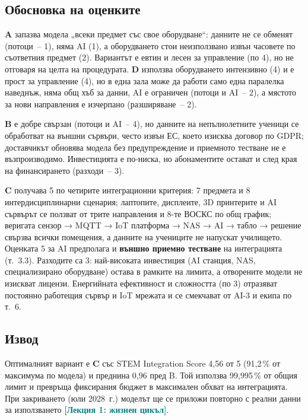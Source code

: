 \documentclass[11pt,a4paper]{article}
\newcommand{\lecturetag}[1]{\textcolor{teal}{\small\bfseries[#1]}}
\newcommand{\PctUse}{99,995\,\%}
\begin{document}
\subsection{Обосновка на оценките}

\textbf{A} запазва модела „всеки предмет със свое оборудване“: данните не се обменят (потоци~– 1), няма AI (1), а оборудването стои неизползвано извън часовете по съответния предмет (2). Вариантът е евтин и лесен за управление (по 4), но не отговаря на целта на процедурата. \textbf{D} използва оборудването интензивно (4) и е прост за управление (4), но в една зала може да работи само една паралелка наведнъж, няма общ хъб за данни, AI е ограничен (потоци и AI~– 2), а мястото за нови направления е изчерпано (разширяване~– 2).

\textbf{B} е добре свързан (потоци и AI~– 4), но данните на непълнолетните ученици се обработват на външни сървъри, често извън ЕС, което изисква договор по GDPR; доставчикът обновява модела без предупреждение и приемното тестване не е възпроизводимо. Инвестицията е по-ниска, но абонаментите остават и след края на финансирането (разходи~– 3).

\textbf{C} получава 5 по четирите интеграционни критерия: 7 предмета и 8 интердисциплинарни сценария; лаптопите, дисплеите, 3D принтерите и AI сървърът се ползват от трите направления и 8-те ВОСКС по общ график; веригата сензор → MQTT → IoT платформа → NAS → AI → табло → решение свързва всички помещения, а данните на учениците не напускат училището. Оценката 5 за AI предполага и \textbf{външно приемно тестване} на интеграцията (т.~3.3). Разходите са 3: най-високата инвестиция (AI станция, NAS, специализирано оборудване) остава в рамките на лимита, а отворените модели не изискват лицензи. Енергийната ефективност и сложността (по 3) отразяват постоянно работещия сървър и IoT мрежата и се смекчават от AI-3 и екипа по т.~6.

\subsection{Извод}

Оптималният вариант е \textbf{C} със STEM Integration Score 4,56 от 5 (91,2\,\% от максимума по модела) и преднина 0,96 пред B. Той използва \PctUse{} от общия лимит и превръща фиксирания бюджет в максимален обхват на интеграцията. При закриването (юли 2028~г.) моделът ще се приложи повторно с реални данни за използването \lecturetag{Лекция 1: жизнен цикъл}.

\clearpage%
\end{document}
